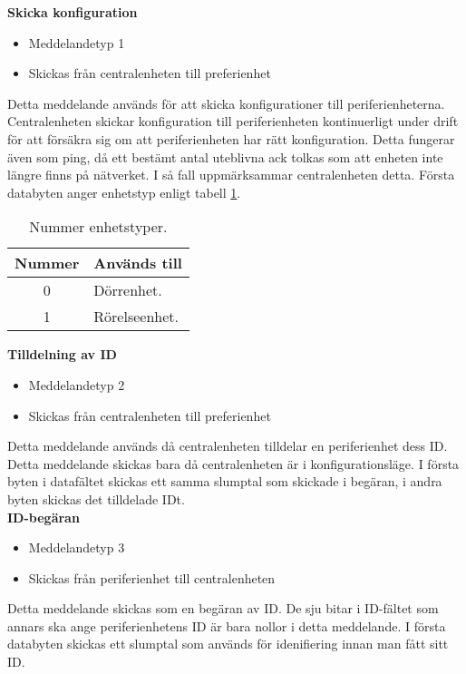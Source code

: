 \textbf{Skicka konfiguration}
\begin{itemize}
    \item Meddelandetyp 1
    \item Skickas från centralenheten till preferienhet
\end{itemize}
Detta meddelande används för att skicka konfigurationer till periferienheterna.
Centralenheten skickar konfiguration till periferienheten kontinuerligt under drift för att försäkra sig om att periferienheten har rätt konfiguration. Detta fungerar även som ping, då ett bestämt antal uteblivna ack tolkas som att enheten inte längre finns på nätverket.
I så fall uppmärksammar centralenheten detta.
Första databyten anger enhetstyp enligt tabell \ref{tab:enhetstyper}.
\begin{table}
	\centering
	\begin{tabular}{|c|p{}|}
		\hline
		Nummer & Används till \\ \hline \hline
		0 & Dörrenhet. \\ \hline
		1 & Rörelseenhet. \\ \hline

	\end{tabular}
	\caption{Nummer enhetstyper.}
	\label{tab:enhetstyper}
\end{table}


\textbf{Tilldelning av ID}
\begin{itemize}
    \item Meddelandetyp 2
    \item Skickas från centralenheten till preferienhet
\end{itemize}
Detta meddelande används då centralenheten tilldelar en periferienhet dess ID. Detta meddelande skickas bara då centralenheten är i konfigurationsläge. I första byten i datafältet skickas ett samma slumptal som skickade i begäran, i andra byten skickas det tilldelade IDt. \\


\textbf{ID-begäran}
\begin{itemize}
    \item Meddelandetyp 3
    \item Skickas från periferienhet till centralenheten
\end{itemize}
Detta meddelande skickas som en begäran av ID. De sju bitar i ID-fältet som annars ska ange periferienhetens ID är bara nollor i detta meddelande. I första databyten skickas ett slumptal som används för idenifiering innan man fått sitt ID.

